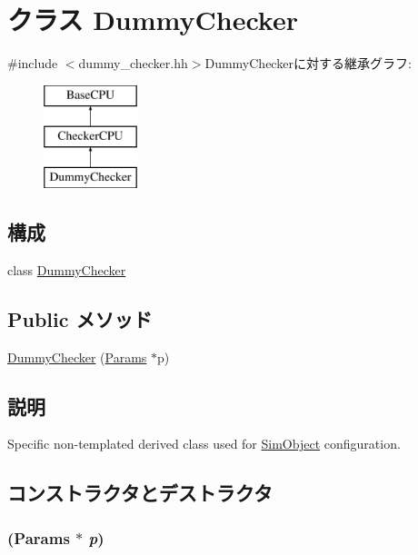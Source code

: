 \hypertarget{classDummyChecker}{
\section{クラス DummyChecker}
\label{classDummyChecker}
}


{\ttfamily \#include $<$dummy\_\-checker.hh$>$}DummyCheckerに対する継承グラフ:\begin{figure}[H]
\begin{center}
\leavevmode
\includegraphics[height=3cm]{classDummyChecker}
\end{center}
\end{figure}
\subsection*{構成}
\begin{DoxyCompactItemize}
\item 
class \hyperlink{classDummyChecker_1_1DummyChecker}{DummyChecker}
\end{DoxyCompactItemize}
\subsection*{Public メソッド}
\begin{DoxyCompactItemize}
\item 
\hyperlink{classDummyChecker_a51fa0abf7268599cc0b0400c0dccb414}{DummyChecker} (\hyperlink{classCheckerCPU_a56bf98a1e02b979e88cbf64420995961}{Params} $\ast$p)
\end{DoxyCompactItemize}


\subsection{説明}
Specific non-\/templated derived class used for \hyperlink{classSimObject}{SimObject} configuration. 

\subsection{コンストラクタとデストラクタ}
\hypertarget{classDummyChecker_a51fa0abf7268599cc0b0400c0dccb414}{
\subsubsection[{DummyChecker}]{ ({\bf Params} $\ast$ {\em p})}}
\label{classDummyChecker_a51fa0abf7268599cc0b0400c0dccb414}



